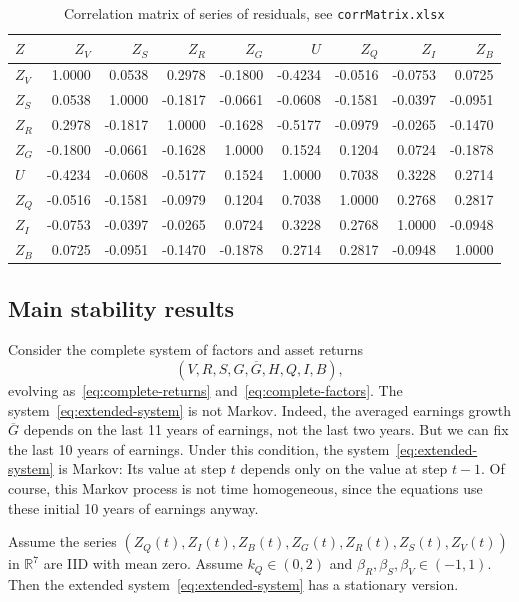 \documentclass[12pt]{amsart}
\begin{document}
\begin{table}[h!]
\centering
\begin{tabular}{|l|rrrrrrrr|}
\hline
$Z$ & $Z_V$ & $Z_S$ & $Z_R$ & $Z_G$ & $U$ & $Z_Q$ & $Z_I$ & $Z_B$ \\
\hline
$Z_V$ & 1.0000  & 0.0538  & 0.2978  & -0.1800 & -0.4234 & -0.0516 & -0.0753 & 0.0725 \\
$Z_S$ & 0.0538  & 1.0000  & -0.1817 & -0.0661 & -0.0608 & -0.1581 & -0.0397 & -0.0951 \\
$Z_R$ & 0.2978  & -0.1817 & 1.0000  & -0.1628 & -0.5177 & -0.0979 & -0.0265 & -0.1470 \\
$Z_G$ & -0.1800 & -0.0661 & -0.1628 & 1.0000  & 0.1524  & 0.1204  & 0.0724  & -0.1878 \\
$U$ & -0.4234 & -0.0608 & -0.5177 & 0.1524  & 1.0000  & 0.7038  & 0.3228  & 0.2714 \\
$Z_Q$ & -0.0516 & -0.1581 & -0.0979 & 0.1204  & 0.7038  & 1.0000  & 0.2768  & 0.2817 \\
$Z_I$ & -0.0753 & -0.0397 & -0.0265 & 0.0724  & 0.3228  & 0.2768  & 1.0000  & -0.0948 \\
$Z_B$  & 0.0725  & -0.0951 & -0.1470 & -0.1878 & 0.2714  & 0.2817  & -0.0948 & 1.0000 \\
\hline
\end{tabular}
\caption{Correlation matrix of series of residuals, see \texttt{corrMatrix.xlsx}}
\end{table}

\subsection{Main stability results} 

Consider the complete system of factors and asset returns
\begin{equation}
\label{eq:extended-system}
(V, R, S, G, \overline{G}, H, Q, I, B),
\end{equation}
evolving as~\eqref{eq:complete-returns} and~\eqref{eq:complete-factors}. The system~\eqref{eq:extended-system} is not Markov. Indeed, the averaged earnings growth $\overline{G}$ depends on the last 11 years of earnings, not the last two years. But we can fix the last 10 years of earnings. Under this condition, the system~\eqref{eq:extended-system} is Markov: Its value at step $t$ depends only on the value at step $t-1$. Of course, this Markov process is not time homogeneous, since the equations use these initial 10 years of earnings anyway. 

\begin{theorem}
\label{thm:new}
Assume the series $(Z_Q(t), Z_I(t), Z_B(t), Z_G(t), Z_R(t), Z_S(t), Z_V(t))$ in $\mathbb R^7$ are IID with mean zero. Assume  $k_Q \in (0, 2)$ and $\beta_R, \beta_S, \beta_V \in (-1, 1)$. Then the extended system~\eqref{eq:extended-system} has a stationary version. 
\label{thm:main}
\end{theorem}
\end{document}
